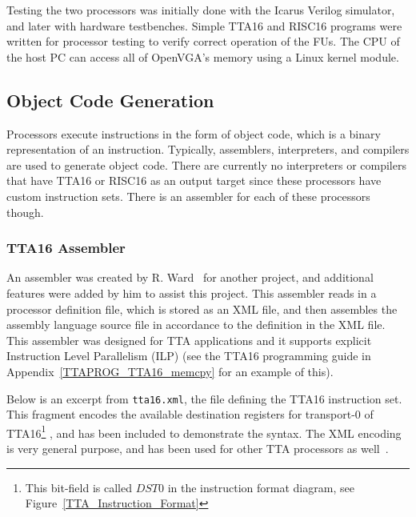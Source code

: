 Testing the two processors was initially done with the Icarus Verilog simulator,
and later with hardware testbenches. Simple TTA16 and RISC16 programs were
written for processor testing to verify correct operation of the FUs. The CPU of
the host PC can access all of OpenVGA's memory using a Linux kernel module.

\subsection{Object Code Generation}
Processors execute instructions in the form of object code, which is a binary
representation of an instruction. Typically, assemblers, interpreters, and
compilers are used to generate object code. There are currently no interpreters
or compilers that have TTA16 or RISC16 as an output target since these processors
have custom instruction sets. There is an assembler for each of these processors
though.

\subsubsection{TTA16 Assembler}

An assembler was created by R. Ward~\cite{XML_Assembler} for another project, and
additional features were added by him to assist this project. This assembler
reads in a processor definition file, which is stored as an XML file, and then
assembles the assembly language source file in accordance to the definition in
the XML file. This assembler was designed for TTA applications and it supports
explicit Instruction Level Parallelism (ILP) (see the TTA16 programming
guide in Appendix~\ref{TTAPROG_TTA16_memcpy} for an example of this).

Below is an excerpt from \texttt{tta16.xml}, the file defining the TTA16
instruction set. This fragment encodes the available destination registers for
transport-0 of TTA16\footnote{This bit-field is called $DST0$ in the instruction
format diagram, see Figure~\ref{TTA_Instruction_Format}} , and has been included
to demonstrate the syntax. The XML encoding is very general purpose, and has been
used for other TTA processors as well~\cite{TTA_Ray_Trace}.

\begin{center}
\begin{minipage}{0.8\linewidth}
\footnotesize

\normalsize
\end{minipage}
\end{center}

